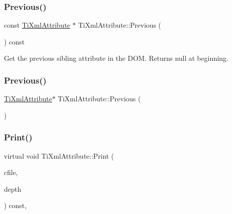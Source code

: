 \subsubsection{\texorpdfstring{Previous()}{Previous()}\hspace{0.1cm}{\footnotesize\ttfamily [1/2]}}
{\footnotesize\ttfamily const \hyperlink{class_ti_xml_attribute}{Ti\+Xml\+Attribute} $\ast$ Ti\+Xml\+Attribute\+::\+Previous (\begin{DoxyParamCaption}{ }\end{DoxyParamCaption}) const}



Get the previous sibling attribute in the D\+OM. Returns null at beginning. 

\mbox{\label{class_ti_xml_attribute_ae4dabc932cba945ed1e92fec5f121193}} 
\subsubsection{\texorpdfstring{Previous()}{Previous()}\hspace{0.1cm}{\footnotesize\ttfamily [2/2]}}
{\footnotesize\ttfamily \hyperlink{class_ti_xml_attribute}{Ti\+Xml\+Attribute}$\ast$ Ti\+Xml\+Attribute\+::\+Previous (\begin{DoxyParamCaption}{ }\end{DoxyParamCaption})\hspace{0.3cm}{\ttfamily [inline]}}

\mbox{\label{class_ti_xml_attribute_a68ae373e03b9c35be4c9d0c3c233b894}} 
\subsubsection{\texorpdfstring{Print()}{Print()}\hspace{0.1cm}{\footnotesize\ttfamily [1/2]}}
{\footnotesize\ttfamily virtual void Ti\+Xml\+Attribute\+::\+Print (\begin{DoxyParamCaption}\item[{F\+I\+LE $\ast$}]{cfile,  }\item[{int}]{depth }\end{DoxyParamCaption}) const\hspace{0.3cm}{\ttfamily [inline]}, {\ttfamily [virtual]}}

